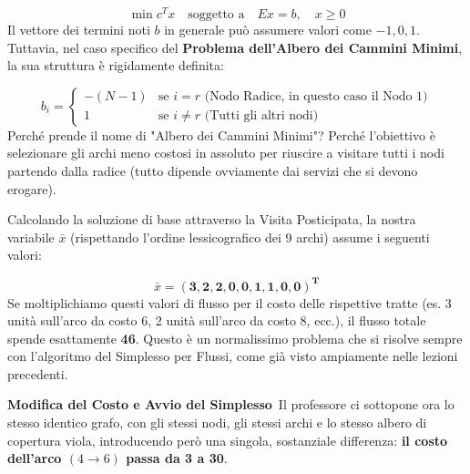 \documentclass[12pt, a4paper]{article}
\newcommand{\separatore}{\noindent{\color{titlecolor!50}\rule{\textwidth}{0.6pt}}}
\begin{document}
	$$\min c^T x \quad \text{soggetto a} \quad Ex = b, \quad x \geq 0$$
	Il vettore dei termini noti $b$ in generale può assumere valori come $-1, 0, 1$. Tuttavia, nel caso specifico del \textbf{Problema dell'Albero dei Cammini Minimi}, la sua struttura è rigidamente definita:
	
	$$b_i = \begin{cases} -(N - 1) & \text{se } i = r \text{ (Nodo Radice, in questo caso il Nodo 1)} \\ 1 & \text{se } i \neq r \text{ (Tutti gli altri nodi)} \end{cases}$$
	Perché prende il nome di "Albero dei Cammini Minimi"? Perché l'obiettivo è selezionare gli archi meno costosi in assoluto per riuscire a visitare tutti i nodi partendo dalla radice (tutto dipende ovviamente dai servizi che si devono erogare).
	
	Calcolando la soluzione di base attraverso la Visita Posticipata, la nostra variabile $\bar{x}$ (rispettando l'ordine lessicografico dei 9 archi) assume i seguenti valori:
	
	$$\bar{x} = \mathbf{(3, 2, 2, 0, 0, 1, 1, 0, 0)^T}$$
	Se moltiplichiamo questi valori di flusso per il costo delle rispettive tratte (es. 3 unità sull'arco da costo 6, 2 unità sull'arco da costo 8, ecc.), il flusso totale spende esattamente \textbf{46}. Questo è un normalissimo problema che si risolve sempre con l'algoritmo del Simplesso per Flussi, come già visto ampiamente nelle lezioni precedenti.
	
	\vspace{0.6cm}
	\separatore
	\vspace{0.4cm}
	
	\textbf{Modifica del Costo e Avvio del Simplesso}\
	Il professore ci sottopone ora lo stesso identico grafo, con gli stessi nodi, gli stessi archi e lo stesso albero di copertura viola, introducendo però una singola, sostanziale differenza: \textbf{il costo dell'arco $(4\to6)$ passa da 3 a 30}.
	
\end{document}
